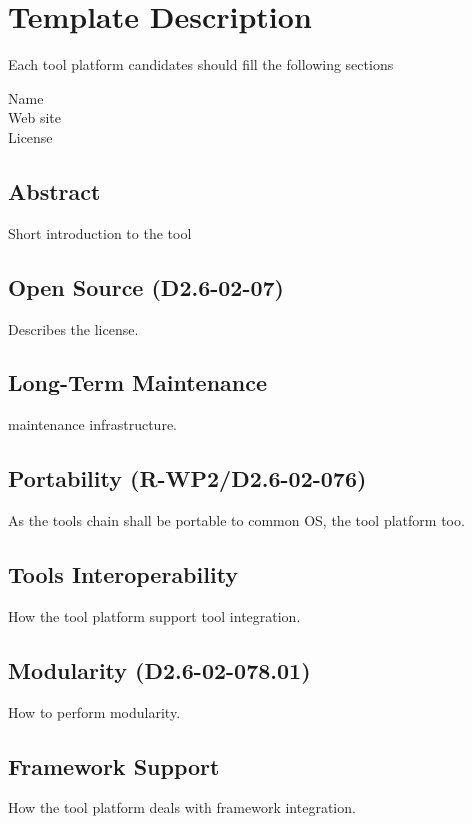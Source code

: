 \chapter{Template Description}
\label{sec:template}


Each tool platform candidates  should  fill the following sections


\begin{description}
\item[Name] 
\item[Web site] 
\item[License] 
\end{description}

\section{Abstract}

Short introduction to the tool

\section{Open Source (D2.6-02-07) }
Describes the license. 


\section{Long-Term Maintenance}
maintenance infrastructure.


\section{Portability (R-WP2/D2.6-02-076)}
As the tools chain shall be portable to common OS, the tool platform too.


\section{Tools Interoperability}
How the tool platform support tool integration.

\section{Modularity (D2.6-02-078.01) }
How to perform modularity.

\section{Framework Support}

How the tool platform deals with framework integration.

